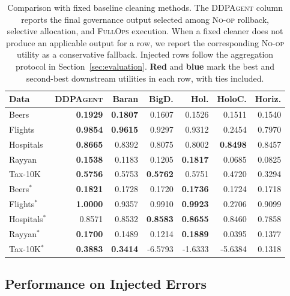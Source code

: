\documentclass[sigconf, nonacm]{acmart}
\newcommand{\sys}{\textsc{DDPAgent}\xspace}
\newcommand{\noop}{\textsc{No-op}\xspace}
\newcommand{\fullops}{\textsc{FullOps}\xspace}
\newcommand{\best}[1]{\textcolor{rankFirst}{\textbf{#1}}}
\newcommand{\runner}[1]{\textcolor{rankSecond}{\textbf{#1}}}
\begin{document}
\begin{table}[t]
  \caption{Comparison with fixed baseline cleaning methods. The \sys column reports the final governance output selected among \noop rollback, selective allocation, and \fullops execution. When a fixed cleaner does not produce an applicable output for a row, we report the corresponding \noop utility as a conservative fallback. Injected rows follow the aggregation protocol in Section~\ref{sec:evaluation}. \best{Red} and \runner{blue} mark the best and second-best downstream utilities in each row, with ties included.}
  \label{tab:baseline-cleaners}
  \centering
  \small
  \setlength{\tabcolsep}{4.5pt}
  \begin{tabular}{@{}lrrrrrr@{}}
    \toprule
    Data & \sys & Baran & BigD. & Hol. & HoloC. & Horiz. \\
    \midrule
    Beers & \best{0.1929} & \runner{0.1807} & 0.1607 & 0.1526 & 0.1511 & 0.1540 \\
    Flights & \best{0.9854} & \runner{0.9615} & 0.9297 & 0.9312 & 0.2454 & 0.7970 \\
    Hospitals & \best{0.8665} & 0.8392 & 0.8075 & 0.8002 & \runner{0.8498} & 0.8457 \\
    Rayyan & \runner{0.1538} & 0.1183 & 0.1205 & \best{0.1817} & 0.0685 & 0.0825 \\
    Tax-10K & \runner{0.5756} & 0.5753 & \best{0.5762} & 0.5751 & 0.4720 & 0.3294 \\
    Beers$^*$ & \best{0.1821} & 0.1728 & 0.1720 & \runner{0.1736} & 0.1724 & 0.1718 \\
    Flights$^*$ & \best{1.0000} & 0.9357 & 0.9910 & \runner{0.9923} & 0.2706 & 0.9099 \\
    Hospitals$^*$ & 0.8571 & 0.8532 & \runner{0.8583} & \best{0.8655} & 0.8460 & 0.7858 \\
    Rayyan$^*$ & \runner{0.1700} & 0.1489 & 0.1214 & \best{0.1889} & 0.0395 & 0.1377 \\
    Tax-10K$^*$ & \best{0.3883} & \runner{0.3414} & -6.5793 & -1.6333 & -5.6384 & 0.1318 \\
    \bottomrule
  \end{tabular}
\end{table}

\subsection{Performance on Injected Errors}
\label{sec:injected-results}
\end{document}
